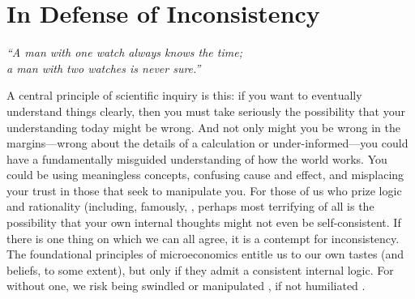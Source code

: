 

\section{In Defense of Inconsistency}

\begin{center}
    \noindent\singlespacingplus
    \it
    ``A man with one watch always knows the time;\\
    a man with two watches is never sure.''
    \citep{segal-law}
\end{center}

%
A central principle of scientific inquiry is this:
    if you want to eventually understand things clearly, then you must take seriously the possibility that your understanding today might be wrong. 
And not only might you be wrong in the margins---wrong about the details of a calculation or under-informed---you could have a fundamentally misguided understanding of how the world works. You could be using meaningless concepts, confusing cause and effect, and misplacing your trust in those that seek to manipulate you. 
For those of us who prize logic and rationality (including, famously, 
\citet{descartes},
perhaps most terrifying of all is the possibility that your own internal thoughts might not even be self-consistent.
If there is one thing on which we can all agree, it is a contempt for inconsistency.
The foundational principles of microeconomics entitle us to our own tastes (and beliefs, to some extent), but only if they admit a consistent internal logic.
For without one, we risk being swindled \citep{RAT} or manipulated \citep{explosion}, if not humiliated \citep{logicalfalacy,emptysetthesis,politicians}.

